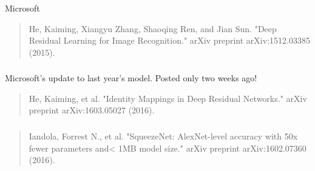 \documentclass[xetex,mathserif,serif,aspectratio=169]{beamer}
\begin{document}
\begin{frame}[fragile] \frametitle{} \oldB \small


Microsoft
\begin{quote}
He, Kaiming, Xiangyu Zhang, Shaoqing Ren, and Jian Sun. "Deep Residual Learning for Image Recognition." arXiv preprint arXiv:1512.03385 (2015).
\end{quote}


\end{frame}

\begin{frame}[fragile] \frametitle{} \oldB \small


Microsoft's update to last year's model. Posted only two
weeks ago!
\begin{quote}
He, Kaiming, et al. "Identity Mappings in Deep Residual Networks." arXiv preprint arXiv:1603.05027 (2016).
\end{quote}

\end{frame}

\begin{frame}[fragile] \frametitle{} \oldB \small


\begin{quote}
Iandola, Forrest N., et al. "SqueezeNet: AlexNet-level accuracy with
50x fewer parameters and< 1MB model size." arXiv preprint arXiv:1602.07360 (2016).
\end{quote}


\end{frame}
\end{document}
